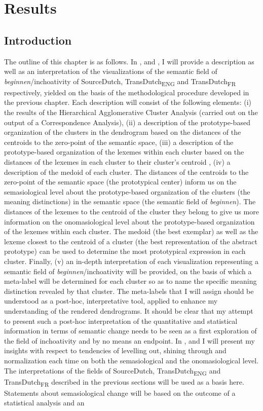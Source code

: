 \chapter{Results}
\label{sec:4}
\section{Introduction}
\label{sec:4.1}  
The outline of this chapter is as follows. In ,  and , I will provide a description as well as an interpretation of the visualizations of the semantic field of \textit{beginnen}/inchoativity of SourceDutch, TransDutch\textsubscript{ENG} and TransDutch\textsubscript{FR} respectively, yielded on the basis of the methodological procedure developed in the previous chapter. Each description will consist of the following elements: (i) the results of the Hierarchical Agglomerative Cluster Analysis (carried out on the output of a Correspondence Analysis), (ii) a description of the prototype-based organization of the clusters in the dendrogram based on the distances of the centroids to the zero-point of the semantic space, (iii) a description of the prototype-based organization of the lexemes within each cluster based on the distances of the lexemes in each cluster to their cluster’s centroid , (iv) a description of the medoid of each cluster. The distances of the centroids to the zero-point of the semantic space (the prototypical center) inform us on the semasiological level about the prototype-based organization of the clusters (the meaning distinctions) in the semantic space (the semantic field of \textit{beginnen}). The distances of the lexemes to the centroid of the cluster they belong to give us more information on the onomasiological level about the prototype-based organization of the lexemes within each cluster. The medoid (the best exemplar) as well as the lexeme closest to the centroid of a cluster (the best representation of the abstract prototype) can be used to determine the most prototypical expression in each cluster. Finally, (v) an in-depth interpretation of each visualization representing a semantic field of \textit{beginnen}/inchoativity will be provided, on the basis of which a meta-label will be determined for each cluster so as to name the specific meaning distinction revealed by that cluster. The meta-labels that I will assign should be understood as a post-hoc, interpretative tool, applied to enhance my understanding of the rendered dendrograms. It should be clear that my attempt to present such a post-hoc interpretation of the quantitative and statistical information in terms of semantic change needs to be seen as a first exploration of the field of inchoativity and by no means an endpoint. In ,  and  I will present my insights with respect to tendencies of levelling out, shining through and normalization each time on both the semasiological and the onomasiological level. The interpretations of the fields of SourceDutch, TransDutch\textsubscript{ENG} and TransDutch\textsubscript{FR} described in the previous sections will be used as a basis here. Statements about semasiological change will be based on the outcome of a statistical analysis and an 